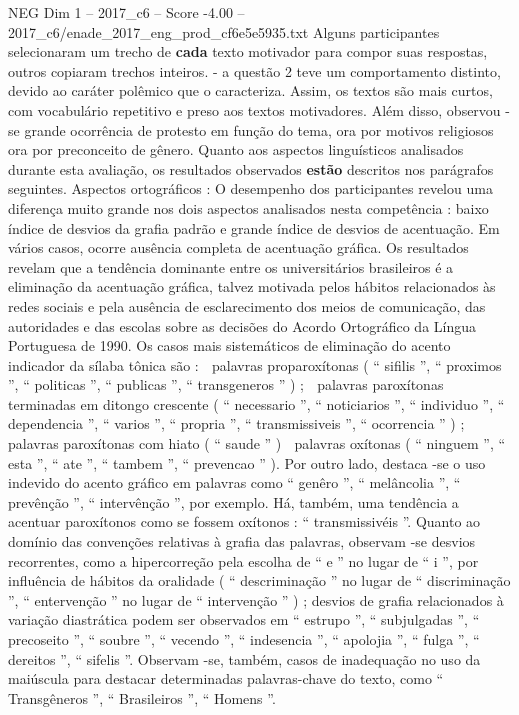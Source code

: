\begin{textsample}{NEG Dim 1 – 2017\_c6 – Score -4.00 – 2017\_c6/enade\_2017\_eng\_prod\_cf6e5e5935.txt}
Alguns participantes selecionaram um trecho de \textbf{cada} texto motivador para compor suas respostas, outros copiaram trechos inteiros. - a questão 2 teve um comportamento distinto, devido ao caráter polêmico que o caracteriza.
Assim, os textos são mais curtos, com vocabulário repetitivo e preso aos textos motivadores.
Além disso, observou -se grande ocorrência de protesto em função do tema, ora por motivos religiosos ora por preconceito de gênero.
Quanto aos aspectos linguísticos analisados durante esta avaliação, os resultados observados \textbf{estão} descritos nos parágrafos seguintes.
Aspectos ortográficos : O desempenho dos participantes revelou uma diferença muito grande nos dois aspectos analisados nesta competência : baixo índice de desvios da grafia padrão e grande índice de desvios de acentuação.
Em vários casos, ocorre ausência completa de acentuação gráfica.
Os resultados revelam que a tendência dominante entre os universitários brasileiros é a eliminação da acentuação gráfica, talvez motivada pelos hábitos relacionados às redes sociais e pela ausência de esclarecimento dos meios de comunicação, das autoridades e das escolas sobre as decisões do Acordo Ortográfico da Língua Portuguesa de 1990.
Os casos mais sistemáticos de eliminação do acento indicador da sílaba tônica são :  palavras proparoxítonas ( “ sifilis ”, “ proximos ”, “ politicas ”, “ publicas ”, “ transgeneros ” ) ;  palavras paroxítonas terminadas em ditongo crescente ( “ necessario ”, “ noticiarios ”, “ individuo ”, “ dependencia ”, “ varios ”, “ propria ”, “ transmissiveis ”, “ ocorrencia ” ) ;  palavras paroxítonas com hiato ( “ saude ” )  palavras oxítonas ( “ ninguem ”, “ esta ”, “ ate ”, “ tambem ”, “ prevencao ” ).
Por outro lado, destaca -se o uso indevido do acento gráfico em palavras como “ genêro ”, “ melâncolia ”, “ prevênção ”, “ intervênção ”, por exemplo.
Há, também, uma tendência a acentuar paroxítonos como se fossem oxítonos : “ transmissivéis ”.
Quanto ao domínio das convenções relativas à grafia das palavras, observam -se desvios recorrentes, como a hipercorreção pela escolha de “ e ” no lugar de “ i ”, por influência de hábitos da oralidade ( “ descriminação ” no lugar de “ discriminação ”, “ entervenção ” no lugar de “ intervenção ” ) ; desvios de grafia relacionados à variação diastrática podem ser observados em “ estrupo ”, “ subjulgadas ”, “ precoseito ”, “ soubre ”, “ vecendo ”, “ indesencia ”, “ apolojia ”, “ fulga ”, “ dereitos ”, “ sifelis ”.
Observam -se, também, casos de inadequação no uso da maiúscula para destacar determinadas palavras-chave do texto, como “ Transgêneros ”, “ Brasileiros ”, “ Homens ”.

\end{textsample}
